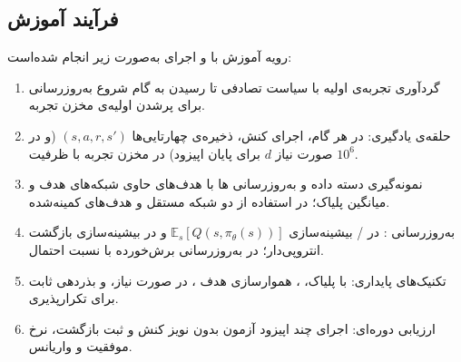 








\subsection{فرآیند آموزش}

رویه آموزش با  و اجرای  به‌صورت زیر انجام شده‌است:
\begin{enumerate}
  \item گردآوری تجربه‌ی اولیه با سیاست تصادفی تا رسیدن به گام شروع به‌روزرسانی برای پرشدن اولیه‌ی مخزن تجربه.
  \item حلقه‌ی یادگیری: در هر گام، اجرای کنش، ذخیره‌ی چهار‌تایی‌ها \((s,a,r,s')\) (و در صورت نیاز \(d\) برای پایان اپیزود) در مخزن تجربه با ظرفیت \(10^6\).
  \item نمونه‌گیری دسته داده  و به‌روزرسانی ها با هدف‌های حاوی شبکه‌های هدف و میانگین پلیاک؛ در 
   استفاده از دو شبکه  مستقل و هدف‌های کمینه‌شده.
  \item به‌روزرسانی : در / بیشینه‌سازی \(\mathbb{E}_s[Q(s,\pi_\theta(s))]\) و در  بیشینه‌سازی بازگشت انتروپی‌دار؛ در  به‌روزرسانی برش‌خورده با نسبت احتمال.
  \item تکنیک‌های پایداری:  با پلیاک، ، هموارسازی هدف ،  در صورت نیاز، و بذردهی ثابت برای تکرارپذیری.
  \item ارزیابی دوره‌ای: اجرای چند اپیزود آزمون بدون نویز کنش و ثبت بازگشت، نرخ موفقیت و واریانس.
\end{enumerate}

